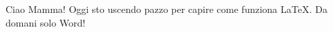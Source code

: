 \documentclass[a4paper,10pt]{article}
\begin{document}
Ciao Mamma! Oggi sto uscendo pazzo per capire come funziona \LaTeX. Da domani solo Word!
\end{document}
